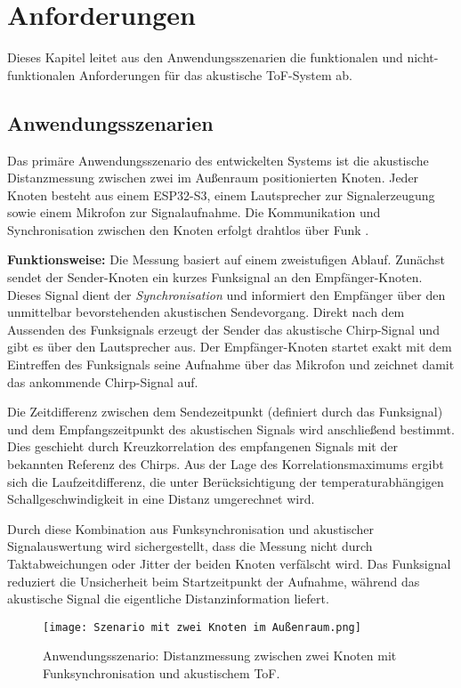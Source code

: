 \section{Anforderungen}

Dieses Kapitel leitet aus den Anwendungsszenarien die funktionalen und nicht-funktionalen Anforderungen für das akustische \ac{ToF}-System ab.

\subsection{Anwendungsszenarien}

Das primäre Anwendungsszenario des entwickelten Systems ist die akustische Distanzmessung zwischen zwei im Außenraum positionierten Knoten. Jeder Knoten besteht aus einem ESP32-S3, einem Lautsprecher zur Signalerzeugung sowie einem Mikrofon zur Signalaufnahme. Die Kommunikation und Synchronisation zwischen den Knoten erfolgt drahtlos über Funk . 

\textbf{Funktionsweise:}  
Die Messung basiert auf einem zweistufigen Ablauf. Zunächst sendet der Sender-Knoten ein kurzes Funksignal an den Empfänger-Knoten. Dieses Signal dient der \textit{Synchronisation} und informiert den Empfänger über den unmittelbar bevorstehenden akustischen Sendevorgang. Direkt nach dem Aussenden des Funksignals erzeugt der Sender das akustische Chirp-Signal und gibt es über den Lautsprecher aus. Der Empfänger-Knoten startet exakt mit dem Eintreffen des Funksignals seine Aufnahme über das Mikrofon und zeichnet damit das ankommende Chirp-Signal auf. 

Die Zeitdifferenz zwischen dem Sendezeitpunkt (definiert durch das Funksignal) und dem Empfangszeitpunkt des akustischen Signals wird anschließend bestimmt. Dies geschieht durch Kreuzkorrelation des empfangenen Signals mit der bekannten Referenz des Chirps. Aus der Lage des Korrelationsmaximums ergibt sich die Laufzeitdifferenz, die unter Berücksichtigung der temperaturabhängigen Schallgeschwindigkeit in eine Distanz umgerechnet wird.  

Durch diese Kombination aus Funksynchronisation und akustischer Signalauswertung wird sichergestellt, dass die Messung nicht durch Taktabweichungen oder Jitter der beiden Knoten verfälscht wird. Das Funksignal reduziert die Unsicherheit beim Startzeitpunkt der Aufnahme, während das akustische Signal die eigentliche Distanzinformation liefert.  

\begin{figure}[h]
    \centering
    \texttt{[image: Szenario mit zwei Knoten im Außenraum.png]}
    \caption{Anwendungsszenario: Distanzmessung zwischen zwei Knoten mit Funksynchronisation und akustischem \ac{ToF}.}
    \label{fig:scenario}
\end{figure}


